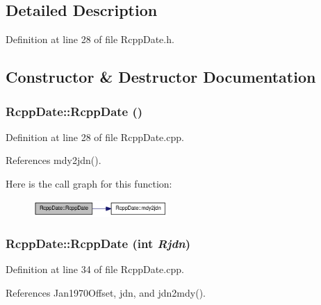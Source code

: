 \subsection{Detailed Description}


Definition at line 28 of file RcppDate.h.

\subsection{Constructor \& Destructor Documentation}
\hypertarget{classRcppDate_a4f0f6ae9e9e284fd058d615bcd78d6f9}{
\subsubsection[{RcppDate}]{\setlength{\rightskip}{0pt plus 5cm}RcppDate::RcppDate ()}}
\label{classRcppDate_a4f0f6ae9e9e284fd058d615bcd78d6f9}


Definition at line 28 of file RcppDate.cpp.

References mdy2jdn().

Here is the call graph for this function:\nopagebreak
\begin{figure}[H]
\begin{center}
\leavevmode
\includegraphics[width=145pt]{classRcppDate_a4f0f6ae9e9e284fd058d615bcd78d6f9_cgraph}
\end{center}
\end{figure}
\hypertarget{classRcppDate_a21adf306ddf84cf792f888d220bb9a3f}{
\subsubsection[{RcppDate}]{\setlength{\rightskip}{0pt plus 5cm}RcppDate::RcppDate (int {\em Rjdn})}}
\label{classRcppDate_a21adf306ddf84cf792f888d220bb9a3f}


Definition at line 34 of file RcppDate.cpp.

References Jan1970Offset, jdn, and jdn2mdy().

